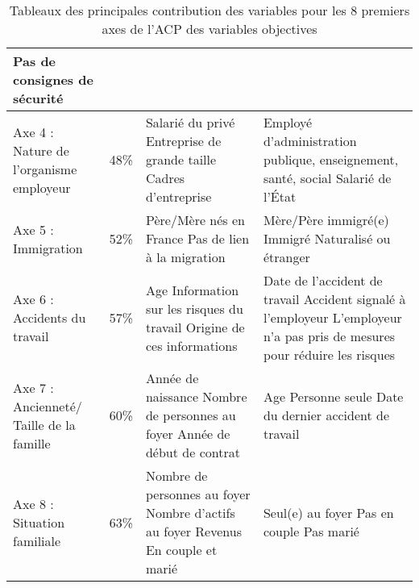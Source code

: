 \documentclass[11pt,fleqn,openany,frenchb]{book} %
\begin{document}
\begin{table}[!h]
\begin{tabular}{|p{3cm}|c|p{4.8cm}|p{4.8cm}|}
    \newline Pas de consignes de sécurité\\
    \hline
    Axe 4 : Nature de l'organisme employeur & 48\%
    & Salarié du privé
    \newline Entreprise de grande taille
    \newline Cadres d'entreprise
    & Employé d'administration publique, enseignement, santé, social
    \newline Salarié de l'\'Etat \\
    \hline
    Axe 5 : Immigration & 52\%
    & Père/Mère nés en France
    \newline Pas de lien à la migration 
    & Mère/Père immigré(e)
    \newline Immigré
    \newline Naturalisé ou étranger\\
    \hline  
    Axe 6 : Accidents du travail & 57\%
    & Age
    \newline Information sur les risques du travail
    \newline Origine de ces informations
    & Date de l'accident de travail
    \newline Accident signalé à l'employeur
    \newline L'employeur n'a pas pris de mesures pour réduire les risques \\
    \hline
    Axe 7 : Ancienneté/ Taille de la famille & 60\%  %
    & Année de naissance
    \newline Nombre de personnes au foyer
    \newline Année de début de contrat
    & Age 
    \newline Personne seule
    \newline Date du dernier accident de travail \\
    \hline
    Axe 8 : Situation familiale & 63\%
    & Nombre de personnes au foyer 
    \newline Nombre d'actifs au foyer 
    \newline Revenus
    \newline En couple et marié
    & Seul(e) au foyer
    \newline Pas en couple
    \newline Pas marié \\
    \hline

\end{tabular}%
\caption{Tableaux des principales contribution des variables pour les 8 premiers axes de l’ACP des variables objectives}
\label{tab:ACPobj}
\end{table}
\end{document}
